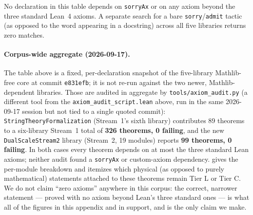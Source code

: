 \documentclass[11pt,a4paper]{article}
\theoremstyle{remark}
\begin{document}
No declaration in this table depends on \texttt{sorryAx} or on any axiom beyond the three standard
Lean~4 axioms. A separate search for a bare \texttt{sorry}/\texttt{admit} tactic (as opposed to the
word appearing in a docstring) across all five libraries returns zero matches.

\paragraph{Corpus-wide aggregate (2026-09-17).} The table above is a fixed, per-declaration snapshot
of the five-library Mathlib-free core at commit \texttt{e831efb}; it is not re-run against the two
newer, Mathlib-dependent libraries. Those are audited in aggregate by
\texttt{tools/axiom\_\discretionary{}{}{}audit.py} (a different tool from the
\texttt{axiom\_audit\_script.lean} above, run in the same 2026-09-17 session but not tied to a single
quoted commit): \texttt{StringTheoryFormalization} (Stream~1's sixth library) contributes 89 theorems
to a six-library Stream~1 total of \textbf{326 theorems, 0 failing}, and the new
\texttt{DualScaleStream2} library (Stream~2, 19 modules) reports \textbf{99 theorems, 0 failing}. In
both cases every theorem depends on at most the three standard Lean axioms; neither audit found a
\texttt{sorryAx} or custom-axiom dependency.  gives the per-module breakdown and
itemizes which physical (as opposed to purely mathematical) statements attached to these theorems
remain Tier L or Tier C. We do not claim ``zero axioms'' anywhere in this corpus: the correct,
narrower statement --- proved with no axiom beyond Lean's three standard ones --- is what all of the
figures in this appendix and in  support, and is the only claim we make.
\end{document}
